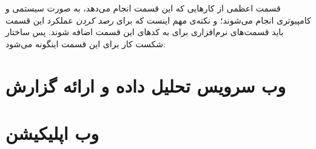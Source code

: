 قسمت اعظمی از کار‌هایی که این قسمت انجام می‌دهد، به صورت سیستمی و کامپیوتری انجام می‌شوند؛ و نکته‌ی مهم اینست که برای \textit{رصد کردن} عملکرد این قسمت باید قسمت‌های نرم‌افزاری برای  به کد‌های این قسمت اضافه شوند. پس ساختار شکست کار برای این قسمت اینگونه می‌شود:

\subsection{}
\subsection{}

\section{وب سرویس تحلیل داده و ارائه گزارش}

\section{وب اپلیکیشن}